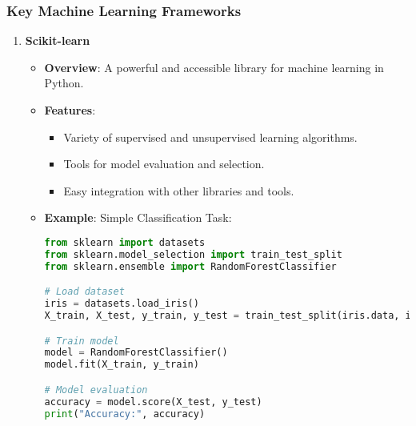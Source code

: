 \documentclass[aspectratio=169]{beamer}
\begin{document}
\begin{frame}[fragile]
    \frametitle{Key Machine Learning Frameworks}
    
    \begin{enumerate}
        \item \textbf{Scikit-learn}
            \begin{itemize}
                \item \textbf{Overview}: A powerful and accessible library for machine learning in Python.
                \item \textbf{Features}:
                    \begin{itemize}
                        \item Variety of supervised and unsupervised learning algorithms.
                        \item Tools for model evaluation and selection.
                        \item Easy integration with other libraries and tools.
                    \end{itemize}
                \item \textbf{Example}: Simple Classification Task:
                \begin{lstlisting}[language=Python]
from sklearn import datasets
from sklearn.model_selection import train_test_split
from sklearn.ensemble import RandomForestClassifier

# Load dataset
iris = datasets.load_iris()
X_train, X_test, y_train, y_test = train_test_split(iris.data, iris.target, test_size=0.2)

# Train model
model = RandomForestClassifier()
model.fit(X_train, y_train)

# Model evaluation
accuracy = model.score(X_test, y_test)
print("Accuracy:", accuracy)
                \end{lstlisting}
            \end{itemize}
    \end{enumerate}
\end{frame}
\end{document}
